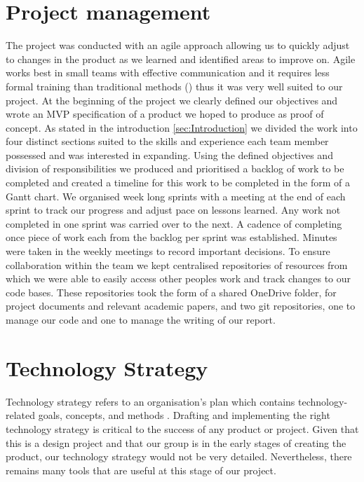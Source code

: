 \section{Project management}
The project was conducted with an agile approach allowing us to quickly adjust to changes in the product as we learned and identified areas to improve on.
Agile works best in small teams with effective communication and it requires less formal training than traditional methods (\cite{Agile}) thus it was very well suited to our project. 
At the beginning of the project we clearly defined our objectives and wrote an MVP specification of a product we hoped to produce as proof of concept.
As stated in the introduction \cref{sec:Introduction} we divided the work into four distinct sections suited to the skills and experience each team member possessed and was interested in expanding.
Using the defined objectives and division of responsibilities we produced and prioritised a backlog of work to be completed and created a timeline for this work to be completed in the form of a Gantt chart.
We organised week long sprints with a meeting at the end of each sprint to track our progress and adjust pace on lessons learned. 
Any work not completed in one sprint was carried over to the next.
A cadence of completing once piece of work each from the backlog per sprint was established.
Minutes were taken in the weekly meetings to record important decisions.
To ensure collaboration within the team we kept centralised repositories of resources from which we were able to easily access other peoples work and track changes to our code bases.
These repositories took the form of a shared OneDrive folder, for project documents and relevant academic papers, and two git repositories, one to manage our code and one to manage the writing of our report.


\section{Technology Strategy}
\label{sec:techstrategy}
Technology strategy refers to an organisation's plan which contains technology-related goals, concepts, and methods \cite{techstratdefinition}. Drafting and implementing the right technology strategy is critical to the success of any product or project. Given that this is a design project and that our group is in the early stages of creating the product, our technology strategy would not be very detailed. Nevertheless, there remains many tools that are useful at this stage of our project.

